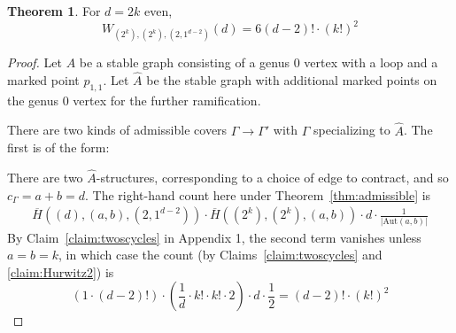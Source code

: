 \documentclass[11pt]{article}           %
\newcommand{\Aut}{\text{Aut}}
\theoremstyle{definition}
\newtheorem{thm}{Theorem}[section]
\begin{document}
\begin{thm}
  \label{thm:genusreduction3}
  For $d=2k$ even,
  \[
  W_{(2^k),(2^k),(2,1^{d-2})}(d)=6(d-2)!\cdot (k!)^2
  \]
\end{thm}
\begin{proof}
  Let $A$ be a stable graph consisting of a genus $0$ vertex with a loop and a marked point $p_{1,1}$.
  Let $\hat A$ be the stable graph with additional marked points on the genus $0$ vertex for
  the further ramification.

There are two kinds of
admissible covers $\Gamma\to\Gamma'$ with $\Gamma$ specializing to $\hat A$. The first
is of the form:


            There are two $\hat A$-structures, corresponding to a choice
            of edge to contract, and so $c_{\Gamma}=a+b=d$. The right-hand count here under Theorem~\ref{thm:admissible} is
            \begin{align*}
              \overline H((d),(a,b),(2,1^{d-2}))\cdot \overline H((2^k),(2^k),(a,b))\cdot d\cdot\frac 1{|\Aut(a,b)|}
            \end{align*}
            By Claim~\ref{claim:twoscycles} in Appendix 1, the second term vanishes unless $a=b=k$, in which case
            the count (by Claims~\ref{claim:twoscycles} and \ref{claim:Hurwitz2}) is
            \[
            (1\cdot (d-2)!)\cdot \left(\frac 1d\cdot k!\cdot k!\cdot 2\right)\cdot d\cdot\frac 12
            =(d-2)!\cdot (k!)^2
            \]


\end{proof}
\end{document}

